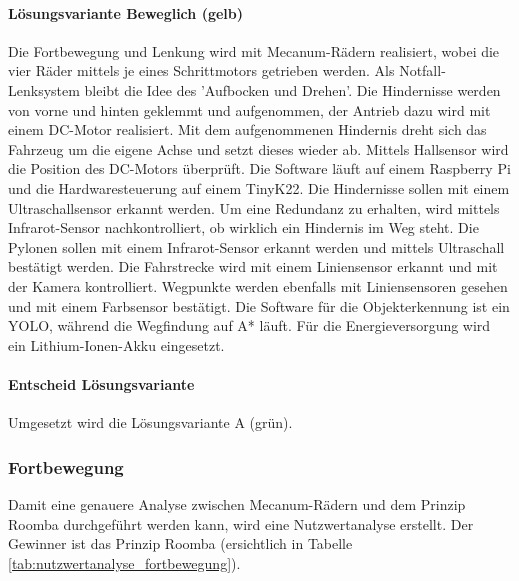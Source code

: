 \documentclass[../main.tex]{subfiles}
\begin{document}
    \paragraph{Lösungsvariante Beweglich (gelb)}
    Die Fortbewegung und Lenkung wird mit Mecanum-Rädern realisiert, wobei die vier Räder mittels je eines Schrittmotors getrieben werden. Als Notfall-Lenksystem bleibt die Idee des 'Aufbocken und Drehen'. Die Hindernisse werden von vorne und hinten geklemmt und aufgenommen, der Antrieb dazu wird mit einem DC-Motor realisiert. Mit dem aufgenommenen Hindernis dreht sich das Fahrzeug um die eigene Achse und setzt dieses wieder ab. Mittels Hallsensor wird die Position des DC-Motors überprüft. Die Software läuft auf einem Raspberry Pi und die Hardwaresteuerung auf einem TinyK22. Die Hindernisse sollen mit einem Ultraschallsensor erkannt werden. Um eine Redundanz zu erhalten, wird mittels Infrarot-Sensor nachkontrolliert, ob wirklich ein Hindernis im Weg steht. Die Pylonen sollen mit einem Infrarot-Sensor erkannt werden und mittels Ultraschall bestätigt werden. Die Fahrstrecke wird mit einem Liniensensor erkannt und mit der Kamera kontrolliert. Wegpunkte werden ebenfalls mit Liniensensoren gesehen und mit einem Farbsensor bestätigt. Die Software für die Objekterkennung ist ein YOLO, während die Wegfindung auf A* läuft. Für die Energieversorgung wird ein Lithium-Ionen-Akku eingesetzt.

    \paragraph{Entscheid Lösungsvariante}
    Umgesetzt wird die Lösungsvariante A (grün).
    
    \subsubsection{Fortbewegung}

    Damit eine genauere Analyse zwischen Mecanum-Rädern und dem Prinzip Roomba durchgeführt werden kann, wird eine Nutzwertanalyse erstellt. Der Gewinner ist das Prinzip Roomba (ersichtlich in Tabelle \ref{tab:nutzwertanalyse_fortbewegung}).
\end{document}
